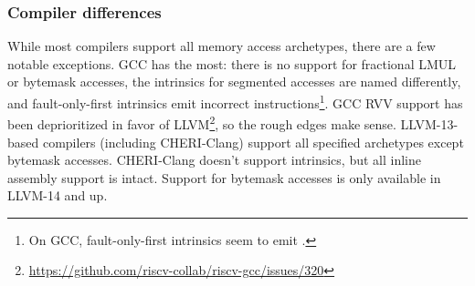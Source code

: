 \subsubsection{Compiler differences}\label{compilerdifferences}
While most compilers support all memory access archetypes, there are a few notable exceptions.
GCC has the most: there is no support for fractional LMUL or bytemask accesses, the intrinsics for segmented accesses are named differently, and fault-only-first intrinsics emit incorrect instructions\footnote{On GCC, fault-only-first intrinsics seem to emit .}.
GCC RVV support has been deprioritized in favor of LLVM\footnote{\url{https://github.com/riscv-collab/riscv-gcc/issues/320}}, so the rough edges make sense.
LLVM-13-based compilers (including CHERI-Clang) support all specified archetypes except bytemask accesses.
CHERI-Clang doesn't support intrinsics, but all inline assembly support is intact.
Support for bytemask accesses is only available in LLVM-14 and up.